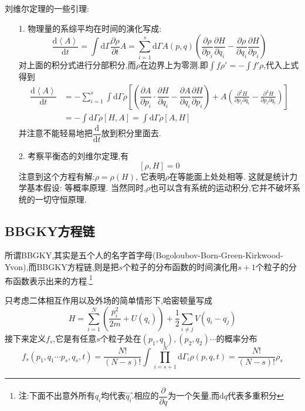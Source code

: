     刘维尔定理的一些引理:
    \begin{itemize}
      \item[1.]物理量的系综平均在时间的演化写成:
        \begin{equation}
          \dfrac{\mathrm{d}\left< A \right> }{\mathrm{d} t}=\int \mathrm{d} \Gamma \dfrac{\partial \rho}{\partial t}A=\sum_{i=1}^{s}\mathrm{d} \Gamma A(p,q)\left( \dfrac{\partial \rho}{\partial p_{i}}\dfrac{\partial H}{\partial q_{i}}-\dfrac{\partial \rho}{\partial q_{i}}\dfrac{\partial H}{\partial p_{i}} \right) 
        \end{equation}
        对上面的积分式进行分部积分,而$\rho$在边界上为零测.即$\displaystyle \int f\rho'=-\int f' \rho$,代入上式得到 
        \begin{align}
          \dfrac{\mathrm{d}\left< A \right> }{\mathrm{d} t} &= -\sum_{i=1}^{s} \int \mathrm{d} \Gamma \rho\left[ \left( \dfrac{\partial A}{\partial p_{i}}\cdot \dfrac{\partial H}{\partial q_{i}}-\dfrac{\partial A}{\partial q_{i}}\dfrac{\partial H}{\partial p_{i}} \right) +A \left( \frac{\partial^2 H}{\partial p_{i} \partial q_{i}}-\frac{\partial^2 H}{\partial p_{i} \partial q_{i}} \right)  \right]\\
          &=-\int \mathrm{d} \Gamma \rho [H,A]=\int \mathrm{d} \Gamma \rho [A,H] 
        \end{align}
        并注意不能轻易地把$\dfrac{\mathrm{d}}{\mathrm{d} t}$放到积分里面去.
      \item[2.]
        考察平衡态的刘维尔定理,有
        \[[\rho,H]=0\]
        注意到这个方程有解:$\rho=\rho(H)$, 它表明$\rho$在等能面上处处相等. 这就是统计力学基本假设: 等概率原理. 当然同时,$\rho$也可以含有系统的运动积分,它并不破坏系统的一切守恒原理.

    \end{itemize}
\subsection{BBGKY方程链}
    所谓BBGKY,其实是五个人的名字首字母(Bogoloubov-Born-Green-Kirkwood-Yvon),而BBGKY方程链,则是把$s$个粒子的分布函数的时间演化用$s+1$个粒子的分布函数表示出来的方程.\footnote{注:下面不出意外所有$q_{i}$均代表$\vec{q_{i}}$.相应的$\dfrac{\partial }{\partial q}$为一个矢量,而$\mathrm{d} q$代表多重积分}

    只考虑二体相互作用以及外场的简单情形下,哈密顿量写成
    \[H=\sum_{i=1}^{N}\left( \frac{p_{i}^{2}}{2m}+U(q_{i}) \right) +\frac{1}{2}\sum_{i\neq j} V(q_{i}-q_{j})\]
    接下来定义$f_{s}$,它是有任意$s$个粒子处在$(p_1,q_1),(p_2,q_2)\cdots$的概率分布
    \[f_{s}(p_1,q_1 \cdots p_{s}, q_{s},t)=\frac{N!}{(N-s)!} \int \prod_{i=s+1}^{N} \mathrm{d} \Gamma_{i} \rho(p,q,t)=\frac{N!}{(N-s)!}\rho_{s}\]

